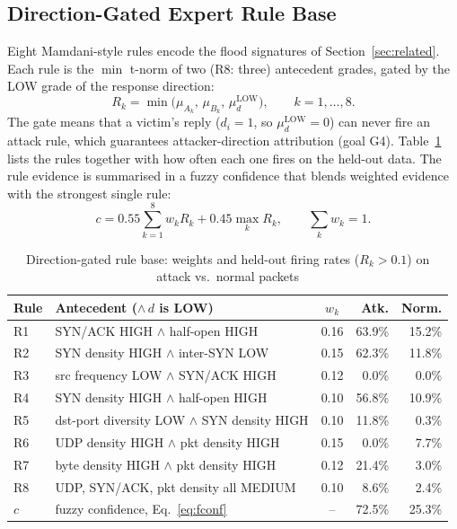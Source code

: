 \documentclass[conference]{IEEEtran}
\begin{document}
\subsection{Direction-Gated Expert Rule Base}
Eight Mamdani-style rules encode the flood signatures of Section~\ref{sec:related}. Each rule is the $\min$ t-norm of two (R8: three) antecedent grades, gated by the LOW grade of the response direction:
\begin{equation}
  R_k=\min\!\big(\mu_{A_k},\,\mu_{B_k},\,\mu^{\mathrm{LOW}}_{d}\big),\qquad k=1,\dots,8.
\end{equation}
The gate means that a victim's reply ($d_i=1$, so $\mu^{\mathrm{LOW}}_{d}=0$) can never fire an attack rule, which guarantees attacker-direction attribution (goal G4). Table~\ref{tab:rules} lists the rules together with how often each one fires on the held-out data. The rule evidence is summarised in a fuzzy confidence that blends weighted evidence with the strongest single rule:
\begin{equation}
  c=0.55\sum_{k=1}^{8}w_kR_k+0.45\max_k R_k,\qquad \textstyle\sum_k w_k=1.
  \label{eq:fconf}
\end{equation}

\begin{table}[t]
\centering
\caption{Direction-gated rule base: weights and held-out firing rates ($R_k>0.1$) on attack vs.\ normal packets}
\label{tab:rules}
\footnotesize
\renewcommand{\arraystretch}{1.1}
\setlength{\tabcolsep}{3.2pt}
\begin{tabular}{@{}l >{\raggedright\arraybackslash}p{3.75cm} c r r@{}}
\toprule
\textbf{Rule} & \textbf{Antecedent} ($\wedge\,d$ is LOW) & $w_k$ & \textbf{Atk.} & \textbf{Norm.} \\
\midrule
R1 & SYN/ACK HIGH $\wedge$ half-open HIGH & 0.16 & 63.9\% & 15.2\% \\
R2 & SYN density HIGH $\wedge$ inter-SYN LOW & 0.15 & 62.3\% & 11.8\% \\
R3 & src frequency LOW $\wedge$ SYN/ACK HIGH & 0.12 & 0.0\% & 0.0\% \\
R4 & SYN density HIGH $\wedge$ half-open HIGH & 0.10 & 56.8\% & 10.9\% \\
R5 & dst-port diversity LOW $\wedge$ SYN density HIGH & 0.10 & 11.8\% & 0.3\% \\
R6 & UDP density HIGH $\wedge$ pkt density HIGH & 0.15 & 0.0\% & 7.7\% \\
R7 & byte density HIGH $\wedge$ pkt density HIGH & 0.12 & 21.4\% & 3.0\% \\
R8 & UDP, SYN/ACK, pkt density all MEDIUM & 0.10 & 8.6\% & 2.4\% \\
\midrule
$c$ & fuzzy confidence, Eq.~\eqref{eq:fconf} & -- & 72.5\% & 25.3\% \\
\bottomrule
\end{tabular}
\end{table}
\end{document}
